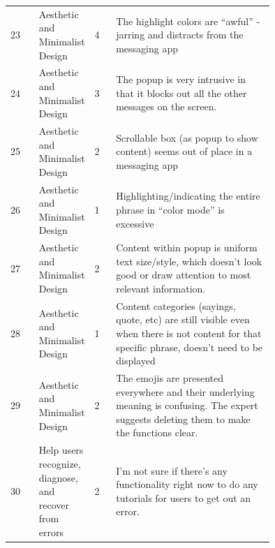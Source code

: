 \documentclass[acmsmall,screen,authorversion,nonacm]{acmart}
\begin{document}
\begin{center}
\begin{longtable}{|l|p{0.15\linewidth}|l|p{0.6\linewidth}|}
23 & Aesthetic and Minimalist Design & 4 & The highlight colors are “awful” - jarring and distracts from the messaging app \\ \cline{1-4}
24 & Aesthetic and Minimalist Design & 3 & The popup is very intrusive in that it blocks out all the other messages on the screen. \\ \cline{1-4}
25 & Aesthetic and Minimalist Design & 2 & Scrollable box (as popup to show content) seems out of place in a messaging app \\ \cline{1-4}
26 & Aesthetic and Minimalist Design & 1 & Highlighting/indicating the entire phrase in “color mode” is excessive  \\ \cline{1-4}
27 & Aesthetic and Minimalist Design & 2 & Content within popup is uniform text size/style, which doesn’t look good or draw attention to most relevant information. \\ \cline{1-4}
28 & Aesthetic and Minimalist Design & 1 & Content categories (sayings, quote, etc) are still visible even when there is not content for that specific phrase, doesn’t need to be displayed \\ \cline{1-4}
29 & Aesthetic and Minimalist Design & 2 & The emojis are presented everywhere and their underlying meaning is confusing. The expert suggests deleting them to make the functions clear. \\ \cline{1-4}

30 & Help users recognize, diagnose, and recover from errors & 2 & I’m not sure if there’s any functionality right now to do any tutorials for users to get out an error. \\ \cline{1-4}


\end{longtable}
\end{center}
\end{document}
